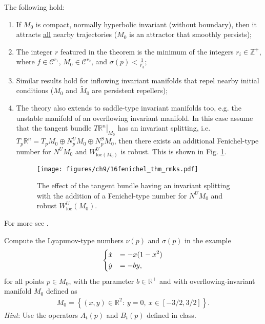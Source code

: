 \begin{remark}[]
	The following hold:
	\begin{enumerate}
		\item If $M_0$ is compact, normally hyperbolic invariant (without boundary), then it attracts \underline{all} nearby trajectories ($M_0$ is an attractor that smoothly persists);
		\item The integer $r$ featured in the theorem is the minimum of the integers $r_i\in \mathbb{Z}^{+}$, where $f \in \mathcal{C}^{r_1}$, $M_0 \in \mathcal{C}^{r_2}$, and $\sigma(p) < \frac{1}{r_3}$;
		\item Similar results hold for inflowing invariant manifolds that repel nearby initial conditions ($M_0$ and $\tilde{M}_{0}$ are persistent repellers);
		\item The theory also extends to saddle-type invariant manifolds too, e.g. the unstable manifold of an overflowing invariant manifold. In this case assume that the tangent bundle $\left.T\mathbb{R}^{n}\right|_{M_0}$ has an invariant splitting, i.e. $T_{p}\mathbb{R}^{n} = T_pM_0 \oplus N_{p}^{U}M_0 \oplus N_{p}^{S}M_0$, then there exists an additional Fenichel-type number for $N^{U}M_0$ and $W^{U}_{ \textrm{loc} (M_0)}$ is robust. This is shown in Fig. \ref{fig:fenichel_thm_rmks}.
		\begin{figure}[h!]
			\centering
			\texttt{[image: figures/ch9/16fenichel\_thm\_rmks.pdf]}
			\caption{The effect of the tangent bundle having an invariant splitting with the addition of a Fenichel-type number for $N^{U}M_0$ and robust $W^{U}_{ \textrm{loc} }(M_0)$.}
			\label{fig:fenichel_thm_rmks}
		\end{figure}
	\end{enumerate}
\end{remark}
For more see \cite{Wiggins1994}.

\begin{exercise}
Compute the Lyapunov-type numbers $\nu(p)$ and $\sigma(p)$ in the example
\begin{align}
\begin{dcases}
	\dot{x} &=-x(1-x^{2})\\
	\dot{y} &=-by,
\end{dcases}
\end{align}
for all points $p\in M_{0}$, with the parameter $b\in\mathbb{R}^{+}$ and with overflowing-invariant manifold $M_{0}$ defined as
\begin{align}
M_{0}=\left\{ (x,y)\in\mathbb{R}^{2}:\ y=0,\ x\in\left[-3/2,3/2\right]\right\} .
\end{align}
\emph{Hint}: Use the operators $A_{t}(p)$ and $B_{t}(p)$ defined in class. 
\end{exercise}

